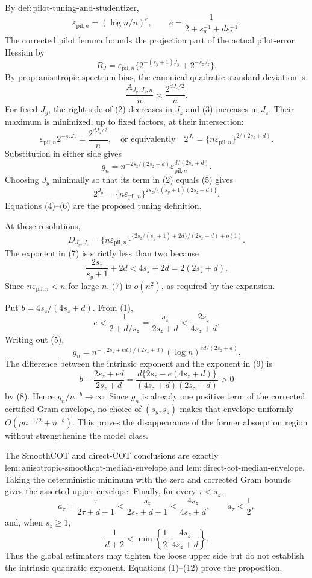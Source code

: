 By \(\mathrm{def{:}pilot\text{-}tuning\text{-}and\text{-}studentizer}\),
\[
\varepsilon_{\mathrm{pil},n}=(\log n/n)^e,
\qquad
e=\frac1{2+s_y^{-1}+ds_z^{-1}}.                                 \tag{1}
\]
The corrected pilot lemma bounds the projection part of the actual pilot-error Hessian by
\[
R_J=\varepsilon_{\mathrm{pil},n}
\{2^{-(s_y+1)J_y}+2^{-s_zJ_z}\}.                               \tag{2}
\]
By \(\mathrm{prop{:}anisotropic\text{-}spectrum\text{-}bias}\), the canonical quadratic standard deviation is
\[
\frac{A_{J_y,J_z,n}}n\asymp\frac{2^{dJ_z/2}}n.                 \tag{3}
\]
For fixed \(J_y\), the right side of (2) decreases in \(J_z\) and (3) increases in \(J_z\). Their maximum is minimized, up to fixed factors, at their intersection:
\[
\varepsilon_{\mathrm{pil},n}2^{-s_zJ_z}
=\frac{2^{dJ_z/2}}n,
\quad\text{or equivalently}\quad
2^{J_z}=\{n\varepsilon_{\mathrm{pil},n}\}^{2/(2s_z+d)}.        \tag{4}
\]
Substitution in either side gives
\[
g_n=n^{-2s_z/(2s_z+d)}
\varepsilon_{\mathrm{pil},n}^{d/(2s_z+d)}.                      \tag{5}
\]
Choosing \(J_y\) minimally so that its term in (2) equals (5) gives
\[
2^{J_y}=\{n\varepsilon_{\mathrm{pil},n}\}^{2s_z/\{(s_y+1)(2s_z+d)\}}. \tag{6}
\]
Equations (4)--(6) are the proposed tuning definition.

At these resolutions,
\[
D_{J_y,J_z}
=\{n\varepsilon_{\mathrm{pil},n}\}^{\{2s_z/(s_y+1)+2d\}/(2s_z+d)+o(1)}. \tag{7}
\]
The exponent in (7) is strictly less than two because
\[
\frac{2s_z}{s_y+1}+2d<4s_z+2d=2(2s_z+d).
\]
Since \(n\varepsilon_{\mathrm{pil},n}<n\) for large \(n\), (7) is \(o(n^2)\), as required by the expansion.

Put \(b=4s_z/(4s_z+d)\). From (1),
\[
e<\frac1{2+d/s_z}=\frac{s_z}{2s_z+d}
<\frac{2s_z}{4s_z+d}.                                          \tag{8}
\]
Writing out (5),
\[
g_n=n^{-(2s_z+ed)/(2s_z+d)}
(\log n)^{ed/(2s_z+d)}.                                         \tag{9}
\]
The difference between the intrinsic exponent and the exponent in (9) is
\[
b-\frac{2s_z+ed}{2s_z+d}
=\frac{d\{2s_z-e(4s_z+d)\}}{(4s_z+d)(2s_z+d)}>0                \tag{10}
\]
by (8). Hence \(g_n/n^{-b}\to\infty\). Since \(g_n\) is already one positive term of the corrected certified Gram envelope, no choice of \((s_y,s_z)\) makes that envelope uniformly \(O(\rho n^{-1/2}+n^{-b})\). This proves the disappearance of the former absorption region without strengthening the model class.

The SmoothCOT and direct-COT conclusions are exactly \(\mathrm{lem{:}anisotropic\text{-}smoothcot\text{-}median\text{-}envelope}\) and \(\mathrm{lem{:}direct\text{-}cot\text{-}median\text{-}envelope}\). Taking the deterministic minimum with the zero and corrected Gram bounds gives the asserted upper envelope. Finally, for every \(\tau<s_z\),
\[
a_\tau=\frac{\tau}{2\tau+d+1}
<\frac{s_z}{2s_z+d+1}<\frac{4s_z}{4s_z+d},
\qquad a_\tau<\frac12,                                         \tag{11}
\]
and, when \(s_z\ge1\),
\[
\frac1{d+2}<\min\!\left\{\frac12,\frac{4s_z}{4s_z+d}\right\}. \tag{12}
\]
Thus the global estimators may tighten the loose upper side but do not establish the intrinsic quadratic exponent. Equations (1)--(12) prove the proposition.